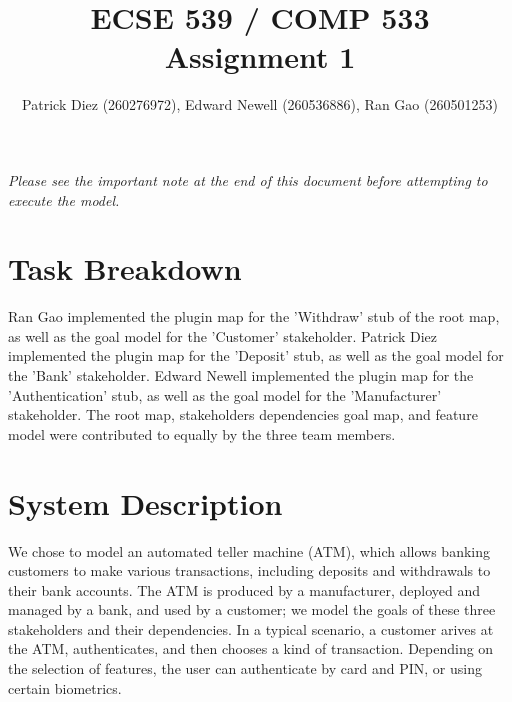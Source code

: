 \documentclass[10pt,fleqn]{article}
\title{ECSE 539 / COMP 533 Assignment 1}
\author{Patrick Diez (260276972), Edward Newell (260536886), Ran Gao (260501253)}
\begin{document}
\maketitle                              %

\textit{Please see the important note at the end of this document before 
attempting to execute the model.}

\section{Task Breakdown}
Ran Gao implemented the plugin map for the 'Withdraw' stub of the root map,
as well as the goal model for the 'Customer' stakeholder. Patrick Diez
implemented the plugin map for the 'Deposit' stub, as well as the goal model
for the 'Bank' stakeholder. Edward Newell implemented the plugin map for the
'Authentication' stub, as well as the goal model for the 'Manufacturer'
stakeholder. The root map, stakeholders dependencies goal map, and feature
model were contributed to equally by the three team members.

\section{System Description}
We chose to model an automated teller machine (ATM), which allows banking
customers to make various transactions, including deposits and withdrawals to
their bank accounts. The ATM is produced by a manufacturer, deployed and 
managed by a bank, and used by a customer; we model the goals of these three 
stakeholders and their dependencies. In a typical scenario, a customer
arives at the ATM, authenticates, and then chooses a kind of transaction.
Depending on the selection of features, the user can authenticate by card and
PIN, or using certain biometrics.  
\end{document}
